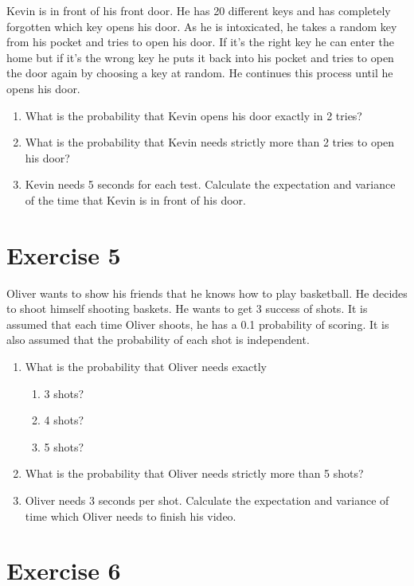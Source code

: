\documentclass[12pt,thmsa]{article}
\begin{document}
Kevin is in front of his front door. He has 20 different keys and has completely forgotten which key opens his door. As he is intoxicated, he takes a random key from his pocket and tries to open his door. If it's the right key he can enter the home but if it's the wrong key he puts it back into his pocket and tries to open the door again by choosing a key at random. He continues this process until he opens his door.

\begin{enumerate}
\item What is the probability that Kevin opens his door exactly in 2 tries?
\item What is the probability that Kevin needs strictly more than 2 tries to open his door?
\item Kevin needs 5 seconds for each test. Calculate the expectation and variance of the time that Kevin is in front of his door.
\end{enumerate}




\section*{Exercise 5}

Oliver wants to show his friends that he knows how to play basketball. He decides to shoot himself shooting baskets. He wants to get 3 success of shots. It is assumed that each time Oliver shoots, he has a 0.1 probability of scoring. It is also assumed that the probability of each shot is independent.

\begin{enumerate}
\item What is the probability that Oliver needs exactly
\begin{enumerate}
\item 3 shots?
\item 4 shots?
\item 5 shots?
\end{enumerate}
\item What is the probability that Oliver needs strictly more than 5 shots?
\item Oliver needs 3 seconds per shot. Calculate the expectation and variance of time
which Oliver needs to finish his video.
\end{enumerate}


\section*{Exercise 6}
\end{document}
